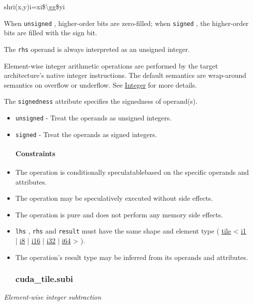 \documentclass{article}
\begin{document}
shri(x,y)i=xi\$\textbackslash{}gg\$yi

When \texttt{unsigned} , higher-order bits are zero-filled; when \texttt{signed} , the higher-order bits are filled with the sign bit.


The \texttt{rhs} operand is always interpreted as an unsigned integer.


Element-wise integer arithmetic operations are performed by the target architecture's native integer instructions. The default semantics are wrap-around semantics on overflow or underflow. See \href{https://docs.nvidia.com/cuda/tile-ir/latest/sections/operations.html#op-group-integer}{Integer} for more details.


The \texttt{signedness} attribute specifies the signedness of operand(s).


\begin{itemize}
\item \texttt{unsigned} - Treat the operands as unsigned integers.
\item \texttt{signed} - Treat the operands as signed integers.


\paragraph{Constraints}

\item The operation is conditionally speculatablebased on the specific operands and attributes.
\item The operation may be speculatively executed without side effects.
\item The operation is pure and does not perform any memory side effects.
\item \texttt{lhs} , \texttt{rhs} and \texttt{result} must have the same shape and element type ( \href{https://docs.nvidia.com/cuda/tile-ir/latest/sections/types.html#type-tile}{tile} < \href{https://docs.nvidia.com/cuda/tile-ir/latest/sections/types.html#subsection-element-types}{i1} | \href{https://docs.nvidia.com/cuda/tile-ir/latest/sections/types.html#subsection-element-types}{i8} | \href{https://docs.nvidia.com/cuda/tile-ir/latest/sections/types.html#subsection-element-types}{i16} | \href{https://docs.nvidia.com/cuda/tile-ir/latest/sections/types.html#subsection-element-types}{i32} | \href{https://docs.nvidia.com/cuda/tile-ir/latest/sections/types.html#subsection-element-types}{i64} > ).
\item The operation's result type may be inferred from its operands and attributes.


\subsubsection{cuda\_tile.subi}

\end{itemize}
\textit{Element-wise integer subtraction}
\end{document}
